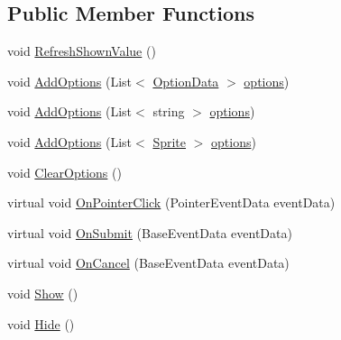 \subsection*{Public Member Functions}
\begin{DoxyCompactItemize}
\item 
void \mbox{\hyperlink{class_t_m_pro_1_1_t_m_p___dropdown_ac99e89e4f86608cd77442d20b9de3aba}{Refresh\+Shown\+Value}} ()
\item 
void \mbox{\hyperlink{class_t_m_pro_1_1_t_m_p___dropdown_aca7bde337dd9fb565f2a8ed96bf4bb25}{Add\+Options}} (List$<$ \mbox{\hyperlink{class_t_m_pro_1_1_t_m_p___dropdown_1_1_option_data}{Option\+Data}} $>$ \mbox{\hyperlink{class_t_m_pro_1_1_t_m_p___dropdown_a43e1c79bd6e32dd4546a6987d684bbb6}{options}})
\item 
void \mbox{\hyperlink{class_t_m_pro_1_1_t_m_p___dropdown_afedde3cc300c5e96287f0e9d8731e34d}{Add\+Options}} (List$<$ string $>$ \mbox{\hyperlink{class_t_m_pro_1_1_t_m_p___dropdown_a43e1c79bd6e32dd4546a6987d684bbb6}{options}})
\item 
void \mbox{\hyperlink{class_t_m_pro_1_1_t_m_p___dropdown_a369717c09b1e1fa94f5e7dfa19ae9c1f}{Add\+Options}} (List$<$ \mbox{\hyperlink{namespace_t_m_pro_ab5662f47179bf1b81c575ecf80b24065a51f2b7b14433aa22c67d1f4fc18943cd}{Sprite}} $>$ \mbox{\hyperlink{class_t_m_pro_1_1_t_m_p___dropdown_a43e1c79bd6e32dd4546a6987d684bbb6}{options}})
\item 
void \mbox{\hyperlink{class_t_m_pro_1_1_t_m_p___dropdown_a031c8b8c5711c7fdb8a64bad0d139a0d}{Clear\+Options}} ()
\item 
virtual void \mbox{\hyperlink{class_t_m_pro_1_1_t_m_p___dropdown_a4694d50db9f52ecc96cb8dc27ea9f8e3}{On\+Pointer\+Click}} (Pointer\+Event\+Data event\+Data)
\item 
virtual void \mbox{\hyperlink{class_t_m_pro_1_1_t_m_p___dropdown_a258ceecac06f7f153c9a3569a817d74f}{On\+Submit}} (Base\+Event\+Data event\+Data)
\item 
virtual void \mbox{\hyperlink{class_t_m_pro_1_1_t_m_p___dropdown_aa645c81e1d5c8ddaef20c6fcb1d77345}{On\+Cancel}} (Base\+Event\+Data event\+Data)
\item 
void \mbox{\hyperlink{class_t_m_pro_1_1_t_m_p___dropdown_ae309311315603a4869384e1591842a73}{Show}} ()
\item 
void \mbox{\hyperlink{class_t_m_pro_1_1_t_m_p___dropdown_a7b1a625bbfae2222ce459deb2df40afd}{Hide}} ()
\end{DoxyCompactItemize}
